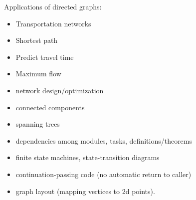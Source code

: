 \documentclass[11pt]{book}
\begin{document}
Applications of directed graphs:~\cite{clrs_2009}
\begin{itemize}
  \item Transportation networks
  \item Shortest path
  \item Predict travel time
  \item Maximum flow
  \item network design/optimization
  \item connected components
  \item spanning trees
  \item dependencies among modules, tasks, definitions/theorems
  \item finite state machines, state-transition diagrams
  \item continuation-passing code (no automatic return to caller)
  \item graph layout (mapping vertices to $2$d points).
\end{itemize}

\label{sec:Category_from_digraph}
\end{document}
